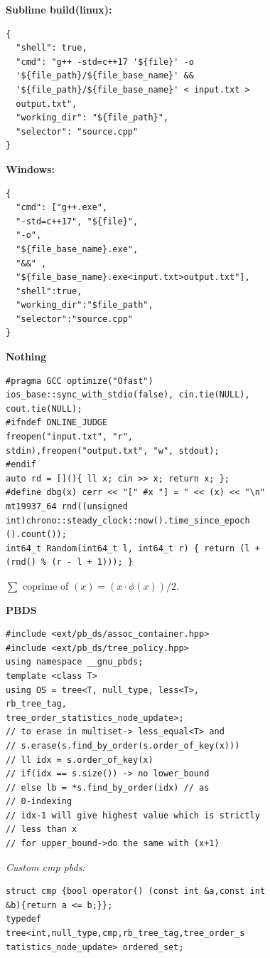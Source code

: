\textbf{\Large Sublime build(linux):}
\begin{lstlisting}
{
  "shell": true,
  "cmd": "g++ -std=c++17 '${file}' -o
  '${file_path}/${file_base_name}' &&
  '${file_path}/${file_base_name}' < input.txt >
  output.txt",
  "working_dir": "${file_path}",
  "selector": "source.cpp"
}
\end{lstlisting}

\textbf{Windows:}
\begin{lstlisting}
{
  "cmd": ["g++.exe",
  "-std=c++17", "${file}",
  "-o",
  "${file_base_name}.exe",
  "&&" ,
  "${file_base_name}.exe<input.txt>output.txt"],
  "shell":true,
  "working_dir":"$file_path",
  "selector":"source.cpp"
}
\end{lstlisting}

\textbf{Nothing}
\begin{lstlisting}
#pragma GCC optimize("Ofast")
ios_base::sync_with_stdio(false), cin.tie(NULL),
cout.tie(NULL);
#ifndef ONLINE_JUDGE
freopen("input.txt", "r",
stdin),freopen("output.txt", "w", stdout);
#endif
auto rd = [](){ ll x; cin >> x; return x; };
#define dbg(x) cerr << "[" #x "] = " << (x) << "\n"
mt19937_64 rnd((unsigned
int)chrono::steady_clock::now().time_since_epoch
().count());
int64_t Random(int64_t l, int64_t r) { return (l +
(rnd() % (r - l + 1))); }
\end{lstlisting}

$\sum$ coprime of $(x) = (x \cdot \phi(x))/2$.

\textbf{PBDS}
\begin{lstlisting}
#include <ext/pb_ds/assoc_container.hpp>
#include <ext/pb_ds/tree_policy.hpp>
using namespace __gnu_pbds;
template <class T>
using OS = tree<T, null_type, less<T>,
rb_tree_tag,
tree_order_statistics_node_update>;
// to erase in multiset-> less_equal<T> and
// s.erase(s.find_by_order(s.order_of_key(x)))
// ll idx = s.order_of_key(x)
// if(idx == s.size()) -> no lower_bound
// else lb = *s.find_by_order(idx) // as
// 0-indexing
// idx-1 will give highest value which is strictly
// less than x
// for upper_bound->do the same with (x+1)
\end{lstlisting}

\textit{Custom cmp pbds:}

\begin{lstlisting}
struct cmp {bool operator() (const int &a,const int
&b){return a <= b;}};
typedef
tree<int,null_type,cmp,rb_tree_tag,tree_order_s
tatistics_node_update> ordered_set;
\end{lstlisting}
